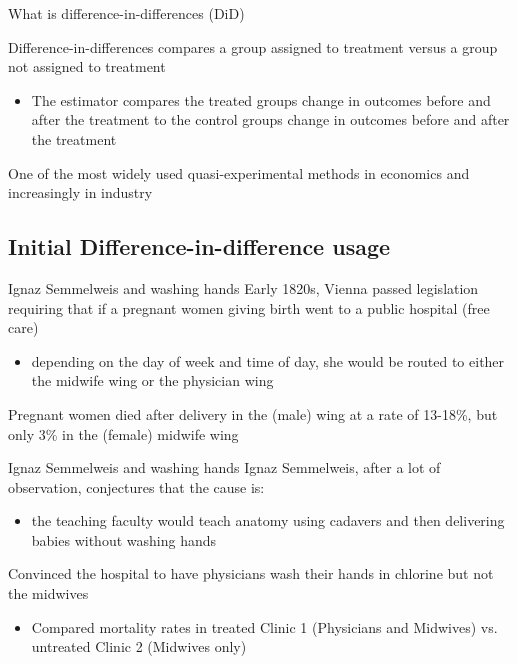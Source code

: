 \documentclass[aspectratio=169,t,11pt,table]{beamer}
\begin{document}
\begin{frame}{What is difference-in-differences (DiD)}

  \alert{Difference-in-differences} compares a group assigned to treatment versus a group not assigned to treatment
  \begin{itemize}
    \item The estimator compares the treated groups change in outcomes before and after the treatment to the control groups change in outcomes before and after the treatment
  \end{itemize}

  \bigskip
  One of the most widely used quasi-experimental methods in economics and increasingly in industry

\end{frame}

\subsection{Initial Difference-in-difference usage}

\begin{frame}{Ignaz Semmelweis and washing hands}
  Early 1820s, Vienna passed legislation requiring that if a pregnant
  women giving birth went to a public hospital (free care)
  \begin{itemize}
    \item depending on the day of week and time of day, she would be routed
    to either the midwife wing or the physician wing
  \end{itemize}
  
  \bigskip
  Pregnant women died after delivery in the (male) wing at a rate of 13-18\%, but only 3\% in the (female) midwife wing
\end{frame}

\begin{frame}{Ignaz Semmelweis and washing hands}
  Ignaz Semmelweis, after a lot of observation, conjectures that the cause is:
  \begin{itemize}
    \item the teaching faculty would teach anatomy using cadavers and then delivering babies without washing hands
  \end{itemize}

  \bigskip
  Convinced the hospital to have physicians wash their hands in chlorine but not the midwives
  \begin{itemize}
    \item Compared mortality rates in treated Clinic 1 (Physicians and Midwives) vs. untreated Clinic 2 (Midwives only)
  \end{itemize} 
\end{frame}
\end{document}
